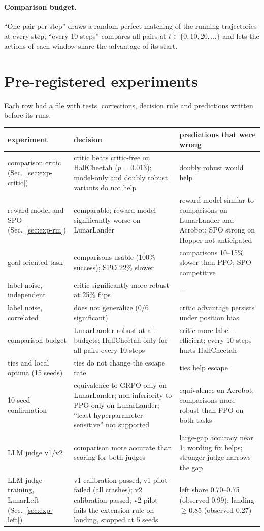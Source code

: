 \documentclass[11pt]{article}
\theoremstyle{remark}
\begin{document}
\paragraph{Comparison budget.} ``One pair per step'' draws a random perfect matching of the running trajectories at every step; ``every 10 steps'' compares all pairs at $t\in\{0,10,20,\dots\}$ and lets the actions of each window share the advantage of its start.

\section{Pre-registered experiments}
\label{app:prereg}
Each row had a file with tests, corrections, decision rule and predictions written before its runs.

\begin{table}[h]
\centering
\small
\begin{tabular}{p{3.4cm}p{5.8cm}p{5.2cm}}
\toprule
experiment & decision & predictions that were wrong \\
\midrule
comparison critic (Sec.~\ref{sec:exp-critic}) & critic beats critic-free on HalfCheetah ($p=0.013$); model-only and doubly robust variants do not help & doubly robust would help \\
reward model and SPO (Sec.~\ref{sec:exp-rm}) & comparable; reward model significantly worse on LunarLander & reward model similar to comparisons on LunarLander and Acrobot; SPO strong on Hopper not anticipated \\
goal-oriented task & comparisons usable (100\% success); SPO 22\% slower & comparisons 10--15\% slower than PPO; SPO competitive \\
label noise, independent & critic significantly more robust at 25\% flips & --- \\
label noise, correlated & does not generalize (0/6 significant) & critic advantage persists under position bias \\
comparison budget & LunarLander robust at all budgets; HalfCheetah only for all-pairs-every-10-steps & critic more label-efficient; every-10-steps hurts HalfCheetah \\
ties and local optima (15 seeds) & ties do not change the escape rate & ties help escape \\
10-seed confirmation & equivalence to GRPO only on LunarLander; non-inferiority to PPO only on LunarLander; ``least hyperparameter-sensitive'' not supported & equivalence on Acrobot; comparisons more robust than PPO on both tasks \\
LLM judge v1/v2 & comparison more accurate than scoring for both judges & large-gap accuracy near 1; wording fix helps; stronger judge narrows the gap \\
LLM-judge training, LunarLeft (Sec.~\ref{sec:exp-left}) & v1 calibration passed, v1 pilot failed (all crashes); v2 calibration passed; v2 pilot fails the extension rule on landing, stopped at 5 seeds & left share 0.70--0.75 (observed 0.99); landing $\ge 0.85$ (observed 0.27) \\
\bottomrule
\end{tabular}
\end{table}
\end{document}
